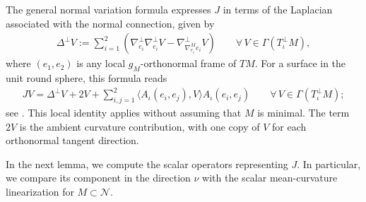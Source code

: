 \documentclass[a4paper,11pt,oneside,reqno]{amsart}
\numberwithin{equation}{section}
\theoremstyle{definition}
\begin{document}
The general normal variation formula expresses $J$ in
terms of the Laplacian associated with the normal
connection, given by
%
\begin{align*}
    \Delta^\perp V
    :=\sum_{i=1}^2\left(
    \nabla^\perp_{e_i}\nabla^\perp_{e_i}V
    -\nabla^\perp_{\nabla^M_{e_i}e_i}V\right)
    \qquad\forall\,V\in\Gamma(T^\perp_\iota M),
\end{align*}
%
where $(e_1,e_2)$ is any local $g_M$-orthonormal frame
of $TM$. For a surface in the unit round sphere, this
formula reads
%
\begin{align}
    \label{eq:s4-normal-variation-formula}
    JV=\Delta^\perp V+2V+
    \sum_{i,j=1}^2
    \langle A_\iota(e_i,e_j),V\rangle A_\iota(e_i,e_j)
    \qquad\forall\,V\in\Gamma(T^\perp_\iota M);
\end{align}
%
see \cite[Lemma~3.1]{LagaceLynchCanonicalFoliation}.
This local identity applies without assuming that $M$
is minimal. The term $2V$ is the ambient curvature
contribution, with one copy of $V$ for each orthonormal
tangent direction.

In the next lemma, we compute the scalar operators representing $J$.
In particular, we compare its component in the direction
$\nu$ with the scalar mean-curvature linearization for
$M\subset\mathcal{N}$.
\end{document}
